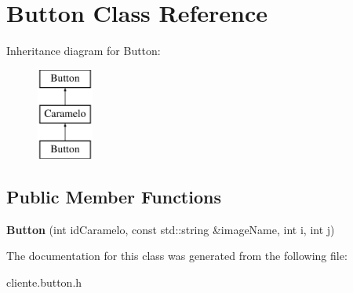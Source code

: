 \hypertarget{classButton}{\section{Button Class Reference}
\label{classButton}
}
Inheritance diagram for Button\-:\begin{figure}[H]
\begin{center}
\leavevmode
\includegraphics[height=3.000000cm]{classButton}
\end{center}
\end{figure}
\subsection*{Public Member Functions}
\begin{DoxyCompactItemize}
\item 
\hypertarget{classButton_adf73efd6bf6f6bc3c24cf98dc7e79501}{{\bfseries Button} (int id\-Caramelo, const std\-::string \&image\-Name, int i, int j)}\label{classButton_adf73efd6bf6f6bc3c24cf98dc7e79501}

\end{DoxyCompactItemize}


The documentation for this class was generated from the following file\-:\begin{DoxyCompactItemize}
\item 
cliente.\-button.\-h\end{DoxyCompactItemize}
